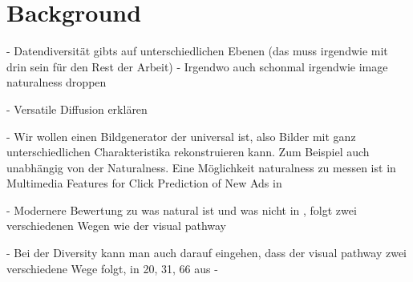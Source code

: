 \chapter{Background}


- Datendiversität gibts auf unterschiedlichen Ebenen (das muss irgendwie mit drin sein für den Rest der Arbeit)
- Irgendwo auch schonmal irgendwie image naturalness droppen



- Versatile Diffusion \cite{xuVersatileDiffusionText2024} erklären

- Wir wollen einen Bildgenerator der universal ist, also Bilder mit ganz unterschiedlichen Charakteristika rekonstruieren kann. Zum Beispiel auch unabhängig von der Naturalness. Eine Möglichkeit naturalness zu messen ist in Multimedia Features for Click Prediction of New Ads in

- Modernere Bewertung zu was natural ist und was nicht in \cite{chenExploringNaturalnessAIGenerated2023}, folgt zwei verschiedenen Wegen wie der visual pathway

- Bei der Diversity kann man auch darauf eingehen, dass der visual pathway zwei verschiedene Wege folgt, in 20, 31, 66 aus \cite{chenExploringNaturalnessAIGenerated2023}
-